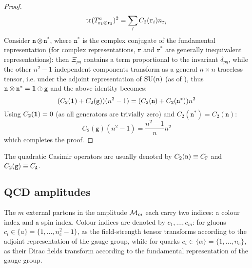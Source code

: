 \begin{proofbox}
\begin{proof}
    \begin{equation*}
      \operatorname{tr} (T^a_{\mathtt{r}_1 \otimes \mathtt{r}_2})^2 = \sum_i C_2(\mathtt{r}_i) n_{\mathtt{r}_i}
    \end{equation*}
    Consider $ \mathtt{n} \otimes \mathtt{n}^* $, where $ \mathtt{n}^* $ is the complex conjugate of the fundamental representation (for complex representations, $ \mathtt{r} $ and $ \mathtt{r}^* $ are generally inequivalent representations): then $ \Xi_{pq} $ contains a term proportional to the invariant $ \delta_{pq} $, while the other $ n^2 - 1 $  independent components transform as a general $ n \times n $ traceless tensor, i.e. under the adjoint representation of $ \mathrm{SU}(n) $ (as of ), thus $ \mathtt{n} \otimes \mathtt{n}^* = \mathbf{1} \oplus \mathtt{g} $ and the above identity becomes:
    \begin{equation*}
      (C_2(\mathbf{1}) + C_2(\mathtt{g})) (n^2 - 1) = (C_2(\mathtt{n}) + C_2(\mathtt{n}^*)) n^2
    \end{equation*}
    Using $ C_2(\mathbf{1}) = 0 $ (as all generators are trivially zero) and $ C_2(\mathtt{n}^*) = C_2(\mathtt{n}) $:
    \begin{equation*}
      C_2(\mathtt{g}) (n^2 - 1) = \frac{n^2 - 1}{n} n^2
    \end{equation*}
    which completes the proof.
  \end{proof}
\end{proofbox}

The quadratic Casimir operators are usually denoted by $ C_2(\mathtt{n}) \equiv C_\mathtt{F} $ and $ C_2(\mathtt{g}) \equiv C_\mathtt{A} $.

\subsection{QCD amplitudes}

The $ m $ external partons in the amplitude $ \mathcal{M}_m $ each carry two indices: a colour index and a spin index. Colour indices are denoted by $ c_1, \dots, c_m $: for gluons $ c_i \in \{a\} = \{1, \dots, n_c^2 - 1\} $, as the field-strength tensor  transforms according to the adjoint representation of the gauge group, while for quarks $ c_i \in \{\alpha\} = \{1, \dots, n_c\} $, as their Dirac fields transform according to the fundamental representation of the gauge group.










